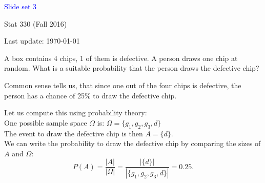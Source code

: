 \documentclass[20pt,landscape]{foils}
\newcommand{\no}{\noindent}
\newcommand{\bul}{\hspace*{.3in}{\textcolor{red}{$\bullet$ \ }}}
\begin{document}
\LogoOff

\foilhead[1.3in]{}
\centerline{\LARGE \textcolor{blue}{Slide set 3}}
\vspace{0.3in}
\centerline{\large Stat 330 (Fall 2016)}
\vspace{0.2in}
\centerline{\tiny Last update: \today}
\setcounter{page}{0}

\foilhead[-.7in]{\textcolor{blue}{Example 1}}
\no A box contains 4 chips, 1 of them is defective. A person draws one chip at random.
What is a suitable probability that the person draws the defective chip?

\no Common sense tells us, that since one out of the four chips is 
defective, the person has a chance of 25\% to draw the defective chip.

\no Let us compute this using probability theory:\\[.1in]
\bul One possible sample space $\Omega$ is: $\Omega = \{ g_{1}, g_{2}, g_{3}, d \}$\\[.1in]
\bul The event to draw the defective chip is then $A  = \{ d \}$.\\[.1in]
\bul We can write the probability to draw the defective chip by comparing 
the sizes of $A$ and $\Omega$:\\[.1in]
\[
P(A) = \frac{|A|}{|\Omega|} = \frac{|\{d\}|}{|\{ g_{1}, g_{2}, g_{3}, d 
\}|} = 0.25.
\]
\end{document}
